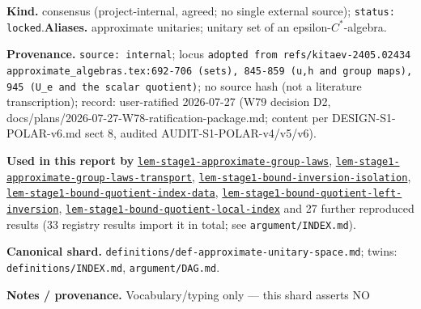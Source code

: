 \begin{defnote}
\textbf{Kind.} consensus (project-internal, agreed; no single external source); \texttt{status: locked}.\quad\textbf{Aliases.} approximate unitaries; unitary set of an epsilon-$C^{*}$-algebra.
\par
\textbf{Provenance.} \texttt{source: internal}; locus \texttt{adopted from refs/\allowbreak{}kitaev-\allowbreak{}2405.\allowbreak{}02434 approximate\_algebras.\allowbreak{}tex:\allowbreak{}692-\allowbreak{}706 (sets),\allowbreak{} 845-\allowbreak{}859 (u,\allowbreak{}h and group maps),\allowbreak{} 945 (U\_e and the scalar quotient)}; no source hash (not a literature transcription); record: user-\allowbreak{}ratified 2026-\allowbreak{}07-\allowbreak{}27 (W79 decision D2,\allowbreak{} docs/\allowbreak{}plans/\allowbreak{}2026-\allowbreak{}07-\allowbreak{}27-\allowbreak{}W78-\allowbreak{}ratification-\allowbreak{}package.\allowbreak{}md;\allowbreak{} content per DESIGN-\allowbreak{}S1-\allowbreak{}POLAR-\allowbreak{}v6.\allowbreak{}md sect 8,\allowbreak{} audited AUDIT-\allowbreak{}S1-\allowbreak{}POLAR-\allowbreak{}v4/\allowbreak{}v5/\allowbreak{}v6).
\par
\textbf{Used in this report by} \hyperref[lem:stage1-approximate-group-laws]{\texttt{lem-\allowbreak{}stage1-\allowbreak{}approximate-\allowbreak{}group-\allowbreak{}laws}}, \hyperref[lem:stage1-approximate-group-laws-transport]{\texttt{lem-\allowbreak{}stage1-\allowbreak{}approximate-\allowbreak{}group-\allowbreak{}laws-\allowbreak{}transport}}, \hyperref[lem:stage1-bound-inversion-isolation]{\texttt{lem-\allowbreak{}stage1-\allowbreak{}bound-\allowbreak{}inversion-\allowbreak{}isolation}}, \hyperref[lem:stage1-bound-quotient-index-data]{\texttt{lem-\allowbreak{}stage1-\allowbreak{}bound-\allowbreak{}quotient-\allowbreak{}index-\allowbreak{}data}}, \hyperref[lem:stage1-bound-quotient-left-inversion]{\texttt{lem-\allowbreak{}stage1-\allowbreak{}bound-\allowbreak{}quotient-\allowbreak{}left-\allowbreak{}inversion}}, \hyperref[lem:stage1-bound-quotient-local-index]{\texttt{lem-\allowbreak{}stage1-\allowbreak{}bound-\allowbreak{}quotient-\allowbreak{}local-\allowbreak{}index}} and 27 further reproduced results (33 registry results import it in total; see \texttt{argument/INDEX.md}).
\par
\textbf{Canonical shard.} \texttt{definitions/\allowbreak{}def-\allowbreak{}approximate-\allowbreak{}unitary-\allowbreak{}space.\allowbreak{}md}; twins: \texttt{definitions/INDEX.md}, \texttt{argument/DAG.md}.
\par
\textbf{Notes / provenance.} Vocabulary/typing only --- this shard asserts NO

\end{defnote}
